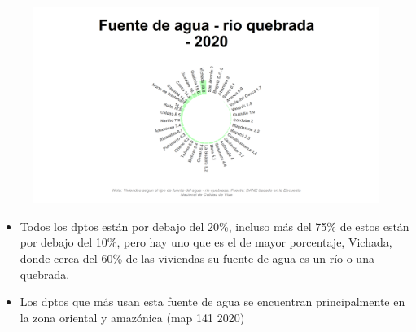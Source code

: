     \begin{figure}[H]
        \caption[Río o quebradas como fuentes de agua por departamentos para 2020 ]{\label{rio_dptos} }
        \begin{center}
        \includegraphics[width=\textwidth,keepaspectratio]{img/var_141_static.png}
        \end{center}
    \end{figure}
            \begin{itemize}
                    \item Todos los dptos están por debajo del 20\%, incluso más del 75\% de estos están por debajo del 10\%, pero hay uno que es el de mayor porcentaje, Vichada, donde cerca del 60\% de las viviendas su fuente de agua es un río o una quebrada.
                    \item Los dptos que más usan esta fuente de agua se encuentran principalmente en la zona oriental y amazónica (map 141 2020)
                    \end{itemize}

